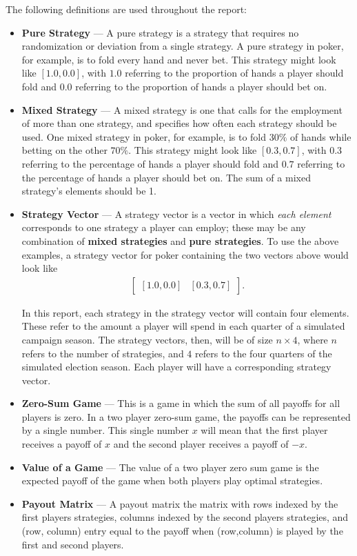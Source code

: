 \documentclass[11pt]{article}
\begin{document}
The following definitions are used throughout the report:
\begin{itemize}
\item \textbf{Pure Strategy} --- A pure strategy is a strategy that requires
no randomization or deviation from a single strategy. A pure strategy in
poker, for example, is to fold every hand and never bet. This strategy
might look like $[1.0,0.0]$, with $1.0$ referring to the proportion of
hands a player should fold and $0.0$ referring to the proportion of hands
a player should bet on.
\item \textbf{Mixed Strategy} --- A mixed strategy is one that calls for the
employment of more than one strategy, and specifies how often each
strategy should be used. One mixed strategy in poker, for example, is to
fold 30$\%$ of hands while betting on the other $70\%$. This strategy
might look like $[0.3,0.7]$, with $0.3$ referring to the percentage of
hands a player should fold and $0.7$ referring to the percentage of hands
a player should bet on. The sum of a mixed strategy's elements should be
1.
\item \textbf{Strategy Vector} --- A strategy vector is a vector in which
\textit{each element} corresponds to one strategy a player can employ;
these may be any combination of \textbf{mixed strategies} and
\textbf{pure strategies}. To use the above examples, a strategy vector
for poker containing the two vectors above would look like
\begin{align*}
\left[ {\begin{array}{cc}
[1.0,0.0] & [0.3,0.7]
\end{array} } \right].
\end{align*}

In this report, each strategy in the strategy vector will contain four
elements. These refer to the amount a player will spend in each quarter
of a simulated campaign season. The strategy vectors, then, will be of
size $n \times 4$, where $n$ refers to the number of strategies, and
$4$ refers to the four quarters of the simulated election season. Each
player will have a corresponding strategy vector.
\item \textbf{Zero-Sum Game} --- This is a game in which the sum of all
payoffs for all players is zero. In a two player zero-sum game, the
payoffs can be represented by a single number. This single number $x$
will mean that the first player receives a payoff of $x$ and the second
player receives a payoff of $-x$.
\item \textbf{Value of a Game} --- The value of a two player zero sum game
is the expected payoff of the game when both players play optimal
strategies.
\item \textbf{Payout Matrix} --- A payout matrix the matrix with rows
indexed by the first players strategies, columns indexed by the second
players strategies, and (row, column) entry equal to the payoff when
(row,column) is played by the first and second players.


\end{itemize}
\end{document}
